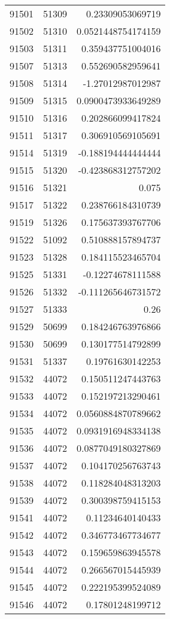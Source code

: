 \begin{tabular}{r | r | r}
91501 & 51309 & 0.23309053069719 \\
91502 & 51310 & 0.0521448754174159 \\
91503 & 51311 & 0.359437751004016 \\
91507 & 51313 & 0.552690582959641 \\
91508 & 51314 & -1.27012987012987 \\
91509 & 51315 & 0.0900473933649289 \\
91510 & 51316 & 0.202866099417824 \\
91511 & 51317 & 0.306910569105691 \\
91514 & 51319 & -0.188194444444444 \\
91515 & 51320 & -0.423868312757202 \\
91516 & 51321 & 0.075 \\
91517 & 51322 & 0.238766184310739 \\
91519 & 51326 & 0.175637393767706 \\
91522 & 51092 & 0.510888157894737 \\
91523 & 51328 & 0.184115523465704 \\
91525 & 51331 & -0.12274678111588 \\
91526 & 51332 & -0.111265646731572 \\
91527 & 51333 & 0.26 \\
91529 & 50699 & 0.184246763976866 \\
91530 & 50699 & 0.130177514792899 \\
91531 & 51337 & 0.19761630142253 \\
91532 & 44072 & 0.150511247443763 \\
91533 & 44072 & 0.152197213290461 \\
91534 & 44072 & 0.0560884870789662 \\
91535 & 44072 & 0.0931916948334138 \\
91536 & 44072 & 0.0877049180327869 \\
91537 & 44072 & 0.104170256763743 \\
91538 & 44072 & 0.118284048313203 \\
91539 & 44072 & 0.300398759415153 \\
91541 & 44072 & 0.11234640140433 \\
91542 & 44072 & 0.346773467734677 \\
91543 & 44072 & 0.159659863945578 \\
91544 & 44072 & 0.266567015445939 \\
91545 & 44072 & 0.222195399524089 \\
91546 & 44072 & 0.17801248199712 \\

\end{tabular}
